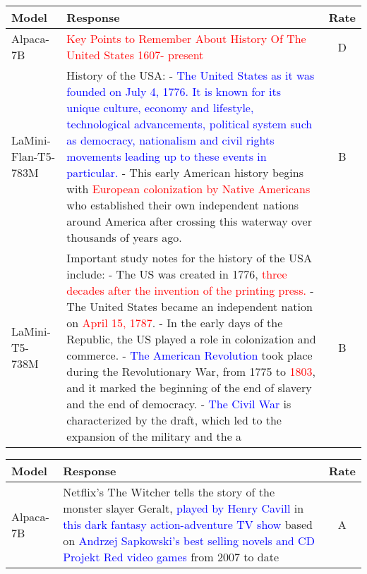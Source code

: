 \documentclass[11pt]{article}
\newcommand{\modelname}{LaMini\xspace}
\begin{document}
\begin{table*}[t]
\centering
\small
\begin{tabular}{lp{}c}
\toprule
Model       & Response    & Rate   \\ \midrule
Alpaca-7B   & \textcolor{red}{Key Points to Remember About History Of The United States 1607- present}  & D      \\ \midrule
\modelname-Flan-T5-783M & History of the USA: - \textcolor{blue}{The United States as it was founded on July 4, 1776. It is known for its unique culture, economy and lifestyle, technological advancements, political system such as democracy, nationalism and civil rights movements leading up to these events in particular.} - This early American history begins with \textcolor{red}{European colonization by Native Americans} who established their own independent nations around America after crossing this waterway over thousands of years ago.   & B       \\ \midrule
\modelname-T5-738M & Important study notes for the history of the USA include: - The US was created in 1776, \textcolor{red}{three decades after the invention of the printing press.} - The United States became an independent nation on \textcolor{red}{April 15, 1787}. - In the early days of the Republic, the US played a role in colonization and commerce. - \textcolor{blue}{The American Revolution} took place during the Revolutionary War, from 1775 to \textcolor{red}{1803}, and it marked the beginning of the end of slavery and the end of democracy. - \textcolor{blue}{The Civil War} is characterized by the draft, which led to the expansion of the military and the a    &  B \\ \bottomrule     
\end{tabular}
\caption{
Model responses to the instruction ``\texttt{Include important study notes and key points that someone should know about the given subject: `history of the USA'}'', where Alpaca-7B fails but \modelname language models manage to respond.
The high-quality contents are highlighted in \textcolor{blue}{blue}.
The errors are highlighted in \textcolor{red}{red}.
}
\label{tab:case_study_positive}
\end{table*} \begin{table*}[t]
\centering
\small
\begin{tabular}{lp{}c}
\toprule
Model       & Response    & Rate   \\ \midrule
Alpaca-7B   & Netflix's The Witcher tells the story of the monster slayer Geralt, \textcolor{blue}{played by Henry Cavill} in \textcolor{blue}{this dark fantasy action-adventure TV show} based on \textcolor{blue}{Andrzej Sapkowski’s best selling novels and CD Projekt Red video games} from 2007 to date  & A      \\ \midrule

\end{tabular}
\end{table*}
\end{document}
